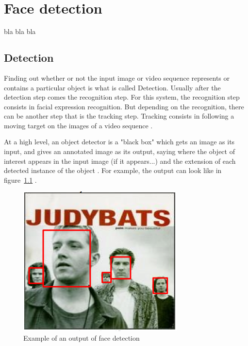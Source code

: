 \chapter{Face detection}

\noindent bla bla bla
\newline

\section{Detection}

\vspace{\baselineskip}
\noindent Finding out whether or not the input image or video sequence represents or contains a particular object is what is called Detection. Usually after the detection step comes the recognition step. For this system, the recognition step consists in facial expression recognition. But depending on the recognition, there can be another step that is the tracking step. Tracking consists in following a moving target on the images of a video sequence \cite{DIN08}.
\newline

\noindent At a high level, an object detector is a "black box" which gets an image as its input, and gives an annotated image as its output, saying where the object of interest appears in the input image (if it appears...) and the extension of each detected instance of the object \cite{DIN08}. For example, the output can look like in figure~\ref{output_example_face_detection} \cite{DIN08}.
\newline

\begin{figure}[!h]
\begin{center}
\noindent \includegraphics[scale=0.7]{figures/output_example_face_detection} 
\newline
\caption{Example of an output of face detection}
\label{output_example_face_detection}
\end{center} 
\end{figure}

